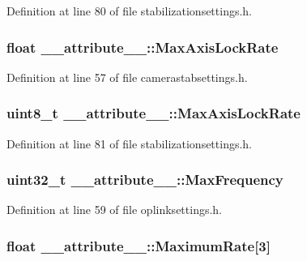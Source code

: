 \-Definition at line 80 of file stabilizationsettings.\-h.

\hypertarget{struct____attribute_____a14f899c6f6607918d81c51a29d671929}{
\subsubsection[{\-Max\-Axis\-Lock\-Rate}]{\setlength{\rightskip}{0pt plus 5cm}float {\bf \-\_\-\-\_\-attribute\-\_\-\-\_\-\-::\-Max\-Axis\-Lock\-Rate}}}\label{struct____attribute_____a14f899c6f6607918d81c51a29d671929}


\-Definition at line 57 of file camerastabsettings.\-h.

\hypertarget{struct____attribute_____a6c79ef4fdb4165baf33d15b69203ca4c}{
\subsubsection[{\-Max\-Axis\-Lock\-Rate}]{\setlength{\rightskip}{0pt plus 5cm}uint8\-\_\-t {\bf \-\_\-\-\_\-attribute\-\_\-\-\_\-\-::\-Max\-Axis\-Lock\-Rate}}}\label{struct____attribute_____a6c79ef4fdb4165baf33d15b69203ca4c}


\-Definition at line 81 of file stabilizationsettings.\-h.

\hypertarget{struct____attribute_____a18d8e936acf9d79d9ec8e75b0ab73ac9}{
\subsubsection[{\-Max\-Frequency}]{\setlength{\rightskip}{0pt plus 5cm}uint32\-\_\-t {\bf \-\_\-\-\_\-attribute\-\_\-\-\_\-\-::\-Max\-Frequency}}}\label{struct____attribute_____a18d8e936acf9d79d9ec8e75b0ab73ac9}


\-Definition at line 59 of file oplinksettings.\-h.

\hypertarget{struct____attribute_____a4c25d3c6452c1b029a0dfb1c1ddf6858}{
\subsubsection[{\-Maximum\-Rate}]{\setlength{\rightskip}{0pt plus 5cm}float {\bf \-\_\-\-\_\-attribute\-\_\-\-\_\-\-::\-Maximum\-Rate}\mbox{[}3\mbox{]}}}\label{struct____attribute_____a4c25d3c6452c1b029a0dfb1c1ddf6858}


